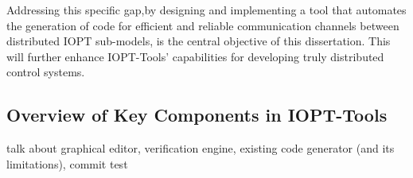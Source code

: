 Addressing this specific gap,by designing and implementing a tool that automates the generation of code for efficient and reliable communication channels between distributed IOPT sub-models, is the central objective of this dissertation. This will further enhance IOPT-Tools' capabilities for developing truly distributed control systems.


\subsection{Overview of Key Components in IOPT-Tools}
\label{sub:iopt_tools_components}

talk about graphical editor, verification engine, existing code generator (and its limitations), commit test 






